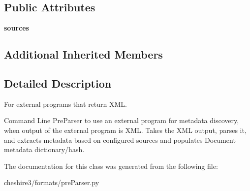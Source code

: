\subsection*{Public Attributes}
\begin{DoxyCompactItemize}
\item 
\hypertarget{classcheshire3_1_1formats_1_1pre_parser_1_1_xml_parsing_cmd_line_metadata_discovery_pre_parser_a92f2b8d1dee7128f9aedc500b86609a1}{{\bfseries sources}}\label{classcheshire3_1_1formats_1_1pre_parser_1_1_xml_parsing_cmd_line_metadata_discovery_pre_parser_a92f2b8d1dee7128f9aedc500b86609a1}

\end{DoxyCompactItemize}
\subsection*{Additional Inherited Members}


\subsection{Detailed Description}
\begin{DoxyVerb}For external programs that return XML.

Command Line PreParser to use an external program for metadata 
discovery, when output of the external program is XML. Takes the 
XML output, parses it, and extracts metadata based on configured 
sources and populates Document metadata dictionary/hash.
\end{DoxyVerb}
 

The documentation for this class was generated from the following file\-:\begin{DoxyCompactItemize}
\item 
cheshire3/formats/pre\-Parser.\-py\end{DoxyCompactItemize}
